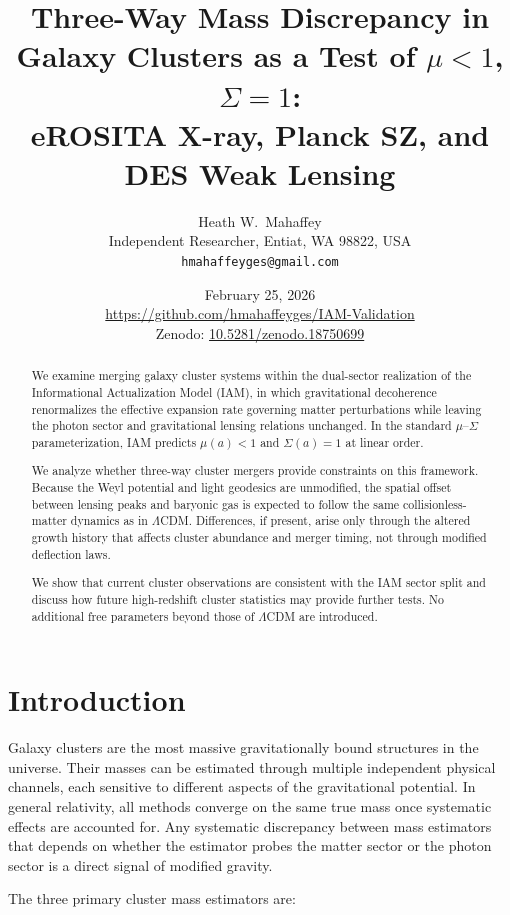 \documentclass[12pt,a4paper]{article}
\title{Three-Way Mass Discrepancy in Galaxy Clusters as a Test of $\mu < 1$, $\Sigma = 1$:\\
eROSITA X-ray, Planck SZ, and DES Weak Lensing}
\author{Heath W.\ Mahaffey\\
\small Independent Researcher, Entiat, WA 98822, USA\\
\small \texttt{hmahaffeyges@gmail.com}}
\date{February 25, 2026\\
\small \url{https://github.com/hmahaffeyges/IAM-Validation}\\
\small Zenodo: \href{https://doi.org/10.5281/zenodo.18750699}{10.5281/zenodo.18750699}}
\begin{document}
\maketitle


\begin{abstract}
We examine merging galaxy cluster systems within the dual-sector realization
of the Informational Actualization Model (IAM), in which gravitational
decoherence renormalizes the effective expansion rate governing matter
perturbations while leaving the photon sector and gravitational lensing
relations unchanged. In the standard $\mu$--$\Sigma$ parameterization,
IAM predicts $\mu(a) < 1$ and $\Sigma(a) = 1$ at linear order.

We analyze whether three-way cluster mergers provide constraints on this
framework. Because the Weyl potential and light geodesics are unmodified,
the spatial offset between lensing peaks and baryonic gas is expected to
follow the same collisionless-matter dynamics as in $\Lambda$CDM.
Differences, if present, arise only through the altered growth history
that affects cluster abundance and merger timing, not through modified
deflection laws.

We show that current cluster observations are consistent with the IAM
sector split and discuss how future high-redshift cluster statistics
may provide further tests. No additional free parameters beyond those
of $\Lambda$CDM are introduced.
\end{abstract}


\section{Introduction}

Galaxy clusters are the most massive gravitationally bound structures in the
universe. Their masses can be estimated through multiple independent physical
channels, each sensitive to different aspects of the gravitational potential. In
general relativity, all methods converge on the same true mass once systematic
effects are accounted for. Any systematic discrepancy between mass estimators that
depends on whether the estimator probes the matter sector or the photon sector is a
direct signal of modified gravity.

The three primary cluster mass estimators are:
\end{document}
